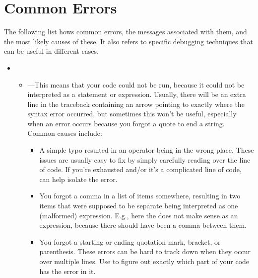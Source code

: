 \documentclass{handout}
\begin{document}

\section{Common Errors}

The following list hows common errors, the messages associated with them, and the most likely causes of these. It also refers to specific debugging techniques that can be useful in different cases.

\begin{itemize}

\item {}

\begin{itemize}
  \item {}---This means that your code could not be run, because it could not be interpreted as a \python statement or expression. Usually, there will be an extra line in the traceback containing an arrow pointing to exactly where the syntax error occurred, but sometimes this won't be useful, especially when an error occurs because you forgot a quote to end a string. Common causes include:
  \begin{itemize}
    \item A simple typo resulted in an operator being in the wrong place. These issues are usually easy to fix by simply carefully reading over the line of code. If you're exhausted and/or it's a complicated line of code,  can help isolate the error.
    \item You forgot a comma in a list of items somewhere, resulting in two items that were supposed to be separate being interpreted as one (malformed) expression. E.g.,  here the  does not make sense as an expression, because there should have been a comma between them.
    \item You forgot a starting or ending quotation mark, bracket, or parenthesis. These errors can be hard to track down when they occur over multiple lines. Use  to figure out exactly which part of your code has the error in it.

  \end{itemize}
\end{itemize}


\end{itemize}
\end{document}
